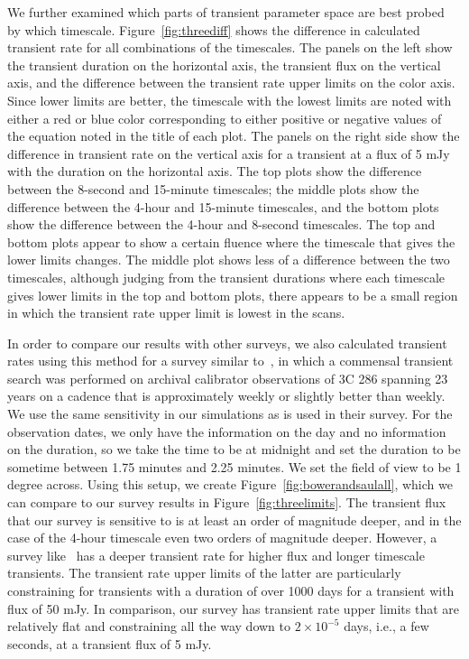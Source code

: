 \documentclass[12pt]{article}
\begin{document}
We further examined which parts of transient parameter space are best probed by which timescale. Figure~\ref{fig:threediff} shows the difference in calculated transient rate for all combinations of the timescales. The panels on the left show the transient duration on the horizontal axis, the transient flux on the vertical axis, and the difference between the transient rate upper limits on the color axis. Since lower limits are better, the timescale with the lowest limits are noted with either a red or blue color corresponding to either positive or negative values of the equation noted in the title of each plot. The panels on the right side show the difference in transient rate on the vertical axis for a transient at a flux of 5 mJy with the duration on the horizontal axis. The top plots show the difference between the 8-second and 15-minute timescales; the middle plots show the difference between the 4-hour and 15-minute timescales, and the bottom plots show the difference between the 4-hour and 8-second timescales. The top and bottom plots appear to show a certain fluence where the timescale that gives the lower limits changes. The middle plot shows less of a difference between the two timescales, although judging from the transient durations where each timescale gives lower limits in the top and bottom plots, there appears to be a small region in which the transient rate upper limit is lowest in the scans. 

In order to compare our results with other surveys, we also calculated transient rates using this method for a survey similar to~\citet{2011ApJ...728L..14B}, in which a commensal transient search was performed on archival calibrator observations of 3C 286 spanning 23 years on a cadence that is approximately weekly or slightly better than weekly. We use the same sensitivity in our simulations as is used in their survey. For the observation dates, we only have the information on the day and no information on the duration, so we take the time to be at midnight and set the duration to be sometime between 1.75 minutes and 2.25 minutes. We set the field of view to be 1 degree across. Using this setup, we create Figure~\ref{fig:bowerandsaulall}, which we can compare to our survey results in Figure~\ref{fig:threelimits}. The transient flux that our survey is sensitive to is at least an order of magnitude deeper, and in the case of the 4-hour timescale even two orders of magnitude deeper. However, a survey like~\citet{2011ApJ...728L..14B} has a deeper transient rate for higher flux and longer timescale transients. The transient rate upper limits of the latter are particularly constraining for transients with a duration of over 1000 days for a transient with flux of 50 mJy. In comparison, our survey has transient rate upper limits that are relatively flat and constraining all the way down to $2\times10^{-5}$ days, i.e., a few seconds, at a transient flux of 5 mJy. 
\end{document}
